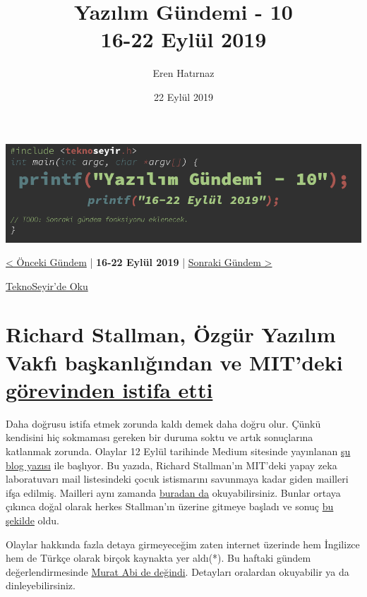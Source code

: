 \documentclass[11pt]{article}
\author{Eren Hatırnaz}
\date{22 Eylül 2019}
\title{Yazılım Gündemi - 10\\\medskip
\large 16-22 Eylül 2019}
\begin{document}
\maketitle
\tableofcontents \clearpage\shorthandoff{=}

\begin{center}
\includegraphics[width=.9\linewidth]{gorseller/yazilim-gundemi-banner.png}
\end{center}

\begin{center}
\href{../09/yazilim-gundemi-09.pdf}{< Önceki Gündem} | \textbf{16-22 Eylül 2019} | \href{../11/yazilim-gundemi-11.pdf}{Sonraki Gündem >}

\href{https://teknoseyir.com/blog/yazilim-gundemi-10-16-22-eylul-2019}{TeknoSeyir'de Oku}
\end{center}

\section{Richard Stallman, Özgür Yazılım Vakfı başkanlığından ve MIT'deki \href{https://www.engadget.com/2019/09/17/rms-fsf-mit-epstein/}{görevinden istifa etti}}
\label{sec:orgb505dee}
Daha doğrusu istifa etmek zorunda kaldı demek daha doğru olur. Çünkü kendisini
hiç sokmaması gereken bir duruma soktu ve artık sonuçlarına katlanmak zorunda.
Olaylar 12 Eylül tarihinde Medium sitesinde yayınlanan \href{https://medium.com/@selamie/remove-richard-stallman-fec6ec210794}{şu blog yazısı} ile
başlıyor. Bu yazıda, Richard Stallman'ın MIT'deki yapay zeka laboratuvarı mail
listesindeki çocuk istismarını savunmaya kadar giden mailleri ifşa edilmiş.
Mailleri aynı zamanda \href{https://assets.documentcloud.org/documents/6405929/09132019142056-0001.pdf}{buradan da} okuyabilirsiniz. Bunlar ortaya çıkınca doğal
olarak herkes Stallman'ın üzerine gitmeye başladı ve sonuç \href{https://www.fsf.org/news/richard-m-stallman-resigns}{bu şekilde} oldu.

Olaylar hakkında fazla detaya girmeyeceğim zaten internet üzerinde hem
İngilizce hem de Türkçe olarak birçok kaynakta yer aldı(*). Bu haftaki gündem
değerlendirmesinde \href{https://youtu.be/aRo4U0scAI4?t=1546}{Murat Abi de değindi}. Detayları oralardan okuyabilir ya da
dinleyebilirsiniz.
\end{document}
